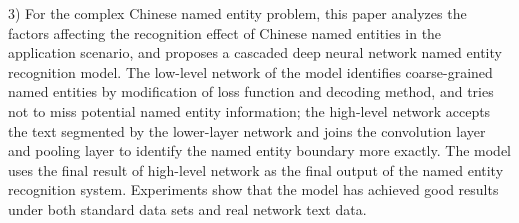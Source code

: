 \documentclass[winfonts,master,oneside,nobackinfo]{njuthesis}
\begin{document}
\begin{englishabstract}
3) For the complex Chinese named entity problem, this paper analyzes the factors affecting the recognition effect of Chinese named entities in the application scenario, and proposes a cascaded deep neural network named entity recognition model. The low-level network of the model identifies coarse-grained named entities by modification of loss function and decoding method, and tries not to miss potential named entity information; the high-level network accepts the text segmented by the lower-layer network and joins the convolution layer and pooling layer to identify the named entity boundary more exactly. The model uses the final result of high-level network as the final output of the named entity recognition system. Experiments show that the model has achieved good results under both standard data sets and real network text data.


\end{englishabstract}

%


\tableofcontents

\listoffigures

\listoftables

\mainmatter

\end{document}
